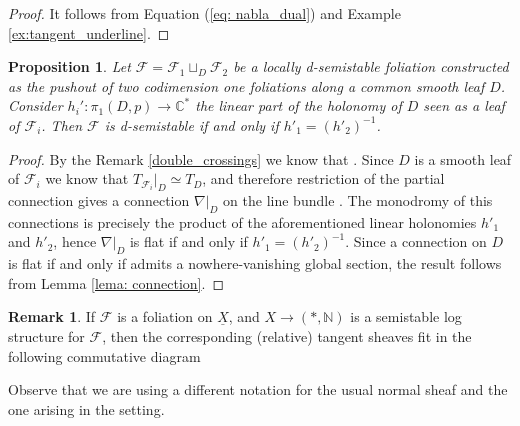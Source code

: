 \documentclass[reqno]{amsart}
\newcommand\C{\mathbb{C}}
\newcommand\N{\mathbb{N}}
\newcommand{\F}{\mathscr{F}}
\newtheorem{proposition}[theorem]{Proposition}
\theoremstyle{definition}
\newtheorem{remark}[theorem]{Remark}
\theoremstyle{named}
\begin{document}
\begin{proof}
It follows from Equation (\ref{eq: nabla_dual}) and Example \ref{ex:tangent_underline}.
\end{proof}



\begin{proposition}\label{prop: linear_hol}
    Let $\F=\F_1 \sqcup_D \F_2$ be a locally d-semistable foliation constructed as the pushout of two codimension one foliations along a common smooth leaf $D$. Consider $h_i':\pi_1(D,p)\rightarrow \C^\ast$ the linear part of the holonomy of $D$ seen as a leaf of $\F_i$. Then $\F$ is d-semistable if and only if $h'_1 = (h'_2)^{-1}$.
\end{proposition}
\begin{proof}
By the Remark \ref{double_crossings} we know that . Since $D$ is a smooth leaf of $\F_i$ we know that $T_{\F_i}|_D \simeq T_D$, and therefore restriction of the partial connection \smash{$\nabla: T_{\F}\otimes T_{\underline{X}}^1\rightarrow T_{\underline{X}}^1$} gives a connection $\nabla|_D$ on the line bundle . The monodromy of this connections is precisely the product of the aforementioned linear holonomies $h'_1$ and $h'_2$, hence $\nabla|_D$ is flat if and only if $h'_1 = (h'_2)^{-1}$. Since a connection on $D$ is flat if and only if admits a nowhere-vanishing global section, the result follows from Lemma \ref{lema: connection}.
\end{proof}

\begin{remark} \label{remark: tangent and T1}
If $\F$ is a foliation on $\underline{X}$, and $X\to (\ast,\N)$ is a semistable log structure for $\F$, then the corresponding (relative) tangent sheaves fit in the following commutative diagram
\begin{center}
\end{center}
Observe that we are using a different notation for the usual normal sheaf and the one arising in the setting. 
\end{remark} 
\end{document}
